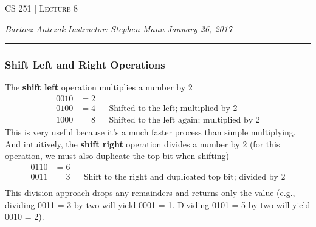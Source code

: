 \documentclass{report}
\newcommand{\lectureNum}{8}
\newcommand{\curDate}{January 26, 2017}
\newcommand{\course}{CS 251}
\newcommand{\instructor}{Stephen Mann}
\begin{document}
\begin{center}
\begin{Large}
\textsc{\course{} | Lecture \lectureNum{}}
\end{Large}
\end{center} 
\noindent \textit{Bartosz Antczak} \hfill
\textit{Instructor: \instructor{}} \hfill
\textit{\curDate{}}
\rule{\textwidth}{0.4pt}
\subsubsection{Shift Left and Right Operations}
The \textbf{shift left} operation multiplies a number by 2
\begin{align*}
0010 &= 2 \\
0100 &= 4 && \text{Shifted to the left; multiplied by 2} \\
1000 &= 8 && \text{Shifted to the left again; multiplied by 2}
\end{align*}
This is very useful because it's a much faster process than simple multiplying.
And intuitively, the \textbf{shift right} operation divides a number by 2 (for this operation, we must also duplicate the top bit when shifting)
\begin{align*}
0110 &= 6 \\
0011 &= 3 && \text{Shift to the right and duplicated top bit; divided by 2} \\
\end{align*}
This division approach drops any remainders and returns only the value (e.g., dividing 0011 = 3 by two will yield 0001 = 1.  Dividing 0101 = 5 by two will yield 0010 = 2).
\end{document}
